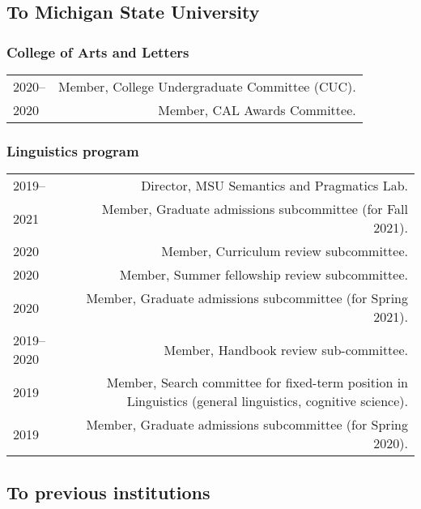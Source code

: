 \documentclass[12pt,letterpaper,twoside]{article}
\makeatletter
\newenvironment{cvsection}{%
  \begin{longtable}[l]{@{}L@{} @{}R@{}}
}{%
  \end{longtable}
}
\makeatother
\begin{document}
\subsection*{To Michigan State University}

\subsubsection*{College of Arts and Letters}

\begin{cvsection}
  2020-- & Member, College Undergraduate Committee (CUC).\\
  2020 & Member, CAL Awards Committee.
\end{cvsection}

\subsubsection*{Linguistics program}

\begin{cvsection}
  2019-- & Director, MSU Semantics and Pragmatics Lab.\\
  2021 & Member, Graduate admissions subcommittee (for Fall 2021).\\
  2020 & Member, Curriculum review subcommittee.\\
  2020 & Member, Summer fellowship review subcommittee.\\
  2020 & Member, Graduate admissions subcommittee (for Spring 2021).\\
  2019--2020 & Member, Handbook review sub-committee.\\
  2019 & Member, Search committee for fixed-term position in Linguistics (general linguistics, cognitive science).\\
  2019 & Member, Graduate admissions subcommittee (for Spring 2020).\\
\end{cvsection}

\subsection*{To previous institutions}
\end{document}
